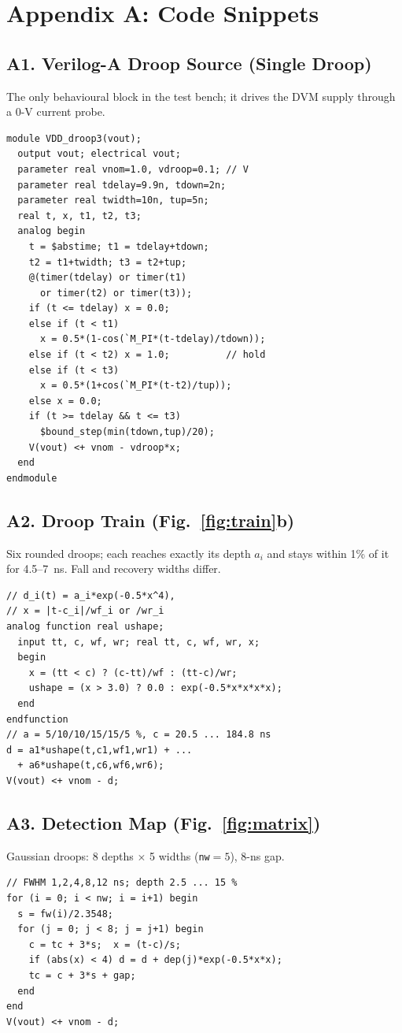 \documentclass[conference]{IEEEtran}
\begin{document}




\section*{Appendix A: Code Snippets}
\subsection*{A1. Verilog-A Droop Source (Single Droop)}
The only behavioural block in the test bench; it drives the DVM supply through a 0-V current probe.
\begin{lstlisting}
module VDD_droop3(vout);
  output vout; electrical vout;
  parameter real vnom=1.0, vdroop=0.1; // V
  parameter real tdelay=9.9n, tdown=2n;
  parameter real twidth=10n, tup=5n;
  real t, x, t1, t2, t3;
  analog begin
    t = $abstime; t1 = tdelay+tdown;
    t2 = t1+twidth; t3 = t2+tup;
    @(timer(tdelay) or timer(t1)
      or timer(t2) or timer(t3));
    if (t <= tdelay) x = 0.0;
    else if (t < t1)
      x = 0.5*(1-cos(`M_PI*(t-tdelay)/tdown));
    else if (t < t2) x = 1.0;          // hold
    else if (t < t3)
      x = 0.5*(1+cos(`M_PI*(t-t2)/tup));
    else x = 0.0;
    if (t >= tdelay && t <= t3)
      $bound_step(min(tdown,tup)/20);
    V(vout) <+ vnom - vdroop*x;
  end
endmodule
\end{lstlisting}

\subsection*{A2. Droop Train (Fig.~\ref{fig:train}b)}
Six rounded droops; each reaches exactly its depth $a_i$ and stays within 1\% of it for 4.5--7~ns. Fall and recovery widths differ.
\begin{lstlisting}
// d_i(t) = a_i*exp(-0.5*x^4),
// x = |t-c_i|/wf_i or /wr_i
analog function real ushape;
  input tt, c, wf, wr; real tt, c, wf, wr, x;
  begin
    x = (tt < c) ? (c-tt)/wf : (tt-c)/wr;
    ushape = (x > 3.0) ? 0.0 : exp(-0.5*x*x*x*x);
  end
endfunction
// a = 5/10/10/15/15/5 %, c = 20.5 ... 184.8 ns
d = a1*ushape(t,c1,wf1,wr1) + ...
  + a6*ushape(t,c6,wf6,wr6);
V(vout) <+ vnom - d;
\end{lstlisting}

\subsection*{A3. Detection Map (Fig.~\ref{fig:matrix})}
Gaussian droops: 8 depths $\times$ 5 widths (\texttt{nw}${}=5$), 8-ns gap.
\begin{lstlisting}
// FWHM 1,2,4,8,12 ns; depth 2.5 ... 15 %
for (i = 0; i < nw; i = i+1) begin
  s = fw(i)/2.3548;
  for (j = 0; j < 8; j = j+1) begin
    c = tc + 3*s;  x = (t-c)/s;
    if (abs(x) < 4) d = d + dep(j)*exp(-0.5*x*x);
    tc = c + 3*s + gap;
  end
end
V(vout) <+ vnom - d;
\end{lstlisting}
\end{document}

